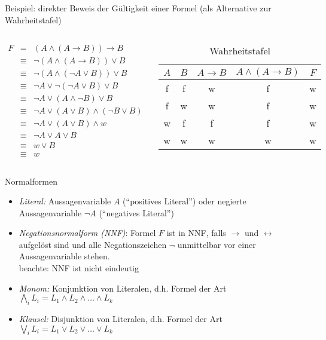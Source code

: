 \begin{frame}{Beispiel: direkter Beweis der Gültigkeit einer Formel (als Alternative zur Wahrheitstafel)}
	\begin{columns}
		\begin{eqnarray*}
				F &=& (A \land (A \rightarrow B)) \rightarrow B\\
				  &\equiv& \neg (A \land (A \rightarrow B)) \lor B\\
				  &\equiv& \neg (A \land (\neg A \lor B)) \lor B\\
				  &\equiv& \neg A \lor \neg(\neg A \lor B) \lor B\\
				  &\equiv& \neg A \lor (A \land \neg B) \lor B\\
				  &\equiv& \neg A \lor (A \lor B) \land (\neg B \lor B)\\
				  &\equiv& \neg A \lor (A \lor B) \land w\\
				  &\equiv& \neg A \lor A \lor B\\
				  &\equiv& w \lor B\\
				  &\equiv& w
		\end{eqnarray*}
		\begin{table}
			\begin{tabular}{|c|c|c|c|c|}
				\hline
				$A$ & $B$ & $A \rightarrow B$ & $A \land (A \rightarrow B)$ & $F$ \\
				\hline
				f & f & w & f & w \\
				\hline
				f & w & w & f & w \\
				\hline
				w & f & f & f & w \\
				\hline
				w & w & w & w & w \\
				\hline
			\end{tabular}
			\caption{Wahrheitstafel}
			\label{tblWahrheitswerteGrundoperationen}
		\end{table}
	\end{columns}		
\end{frame}

\begin{frame}{Normalformen}
	\begin{itemize}
		\item \emph{Literal:} Aussagenvariable $A$ ("`positives Literal"') oder negierte Aussagenvariable $\neg A$ ("`negatives Literal"')
		\item \emph{Negationsnormalform (NNF)}: Formel $F$ ist in NNF, falls $\rightarrow$ und $\leftrightarrow$ aufgelöst sind und alle Negationszeichen $\neg$ unmittelbar vor einer Aussagenvariable stehen.\\
		beachte: NNF ist nicht eindeutig
		\item \emph{Monom:} Konjunktion von Literalen, d.h. Formel der Art\\
		$\bigwedge_iL_i=L_1\land L_2\land\ldots\land L_k$
		\item \emph{Klausel:} Disjunktion von Literalen, d.h. Formel der Art\\
		$\bigvee_iL_i=L_1\lor L_2\lor\ldots\lor L_k$
	\end{itemize}
\end{frame}

